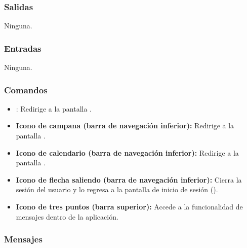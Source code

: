 \subsubsection{Salidas}
Ninguna.

\subsubsection{Entradas}
Ninguna.

\subsubsection{Comandos}
\begin{itemize}
	\item {}: Redirige a la pantalla .
	\item \textbf{Icono de campana (barra de navegación inferior):} Redirige a la pantalla .
	\item \textbf{Icono de calendario (barra de navegación inferior):} Redirige a la pantalla .
	\item \textbf{Icono de flecha saliendo (barra de navegación inferior):} Cierra la sesión del usuario y lo regresa a la pantalla de inicio de sesión ().
	\item \textbf{Icono de tres puntos (barra superior):} Accede a la funcionalidad de mensajes dentro de la aplicación.
\end{itemize}

\subsubsection{Mensajes}

